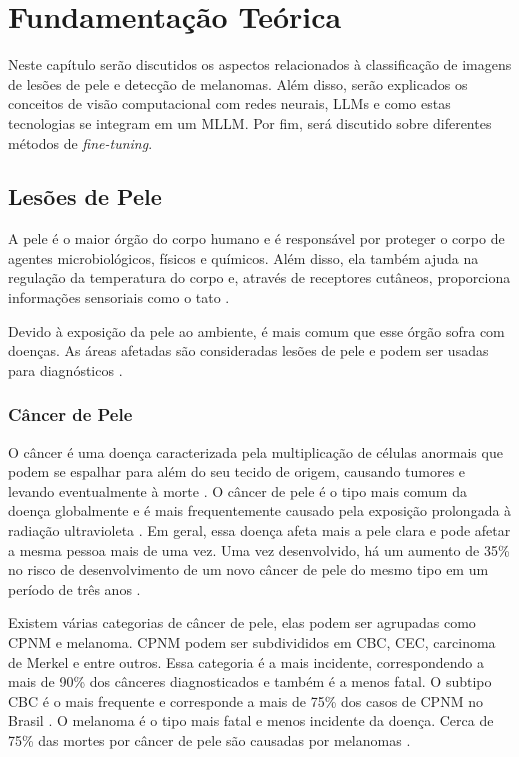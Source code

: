 \chapter{Fundamentação Teórica}

Neste capítulo serão discutidos os aspectos relacionados à classificação de imagens de lesões de pele e detecção de melanomas. Além disso, serão explicados os conceitos
de visão computacional com redes neurais, \acp{LLM} e como estas tecnologias se integram em um \ac{MLLM}. Por fim, será discutido sobre diferentes métodos de
\textit{fine-tuning}.

\section{Lesões de Pele}

A pele é o maior órgão do corpo humano e é responsável por proteger o corpo de agentes microbiológicos, físicos e químicos. Além disso, ela também ajuda na regulação da
temperatura do corpo e, através de receptores cutâneos, proporciona informações sensoriais como o tato \cite{skin}.

Devido à exposição da pele ao ambiente, é mais comum que esse órgão sofra com doenças. As áreas afetadas são consideradas lesões de pele e podem ser usadas para
diagnósticos \cite{segmentation_skin_lesions}.

\subsection{Câncer de Pele}

O câncer é uma doença caracterizada pela multiplicação de células anormais que podem se espalhar para além do seu tecido de origem, causando tumores e levando
eventualmente à morte \cite{cancer}. O câncer de pele é o tipo mais comum da doença globalmente e é mais frequentemente causado pela exposição prolongada à radiação
ultravioleta \cite{skin_cancer}. Em geral, essa doença afeta mais a pele clara e pode afetar a mesma pessoa mais de uma vez. Uma vez desenvolvido, há um aumento de 35\%
no risco de desenvolvimento de um novo câncer de pele do mesmo tipo em um período de três anos \cite{skin_cancer_zink}.

Existem várias categorias de câncer de pele, elas podem ser agrupadas como \ac{CPNM} e melanoma. \ac{CPNM} podem ser subdivididos em \ac{CBC}, \ac{CEC}, carcinoma de
Merkel e entre outros. Essa categoria é a mais incidente, correspondendo a mais de 90\% dos cânceres diagnosticados e também é a menos fatal. O subtipo \ac{CBC} é o
mais frequente e corresponde a mais de 75\% dos casos de \ac{CPNM} no Brasil \cite{skin_cancer_zink}. O melanoma é o tipo mais fatal e menos incidente da doença. Cerca
de 75\% das mortes por câncer de pele são causadas por melanomas \cite{skin_cancer_screening}.

